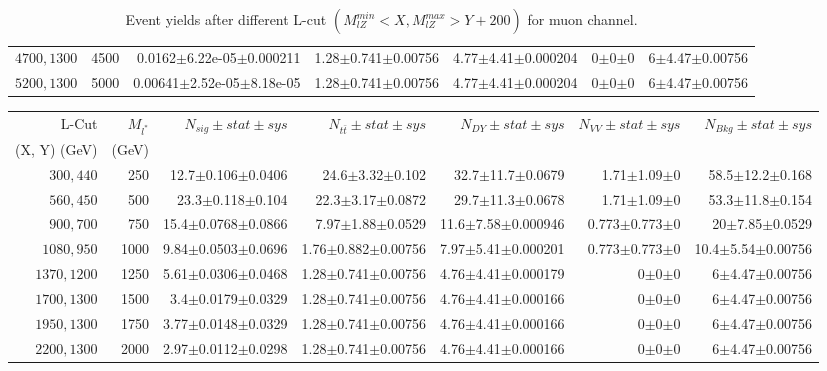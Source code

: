 \documentclass[]{article}
\begin{document}
\begin{table}
\begin{center}
{\begin{tabular}{ |r|r|r|r|r|r|r|}
$4700,1300$ & 4500 & 0.0162$\pm$6.22e-05$\pm$0.000211 & 1.28$\pm$0.741$\pm$0.00756 & 4.77$\pm$4.41$\pm$0.000204 & 0$\pm$0$\pm$0 & 6$\pm$4.47$\pm$0.00756 \\
$5200,1300$ & 5000 & 0.00641$\pm$2.52e-05$\pm$8.18e-05 & 1.28$\pm$0.741$\pm$0.00756 & 4.77$\pm$4.41$\pm$0.000204 & 0$\pm$0$\pm$0 & 6$\pm$4.47$\pm$0.00756 \\
\hline 
\end{tabular}
}
\end{center}
\caption{Event yields after different L-cut $(M_{lZ}^{min} < X, M_{lZ}^{max} > Y + 200)$ for muon channel.}
\end{table}
\begin{table}
\begin{center}
\scriptsize{
\begin{tabular}{ |r|r|r|r|r|r|r|}
\hline 
L-Cut & $M_{l^*}$ & $N_{sig}\pm stat \pm sys $ &$N_{t\bar{t}}\pm stat \pm sys $ & $N_{DY}\pm stat \pm sys $ & $N_{VV}\pm stat \pm sys $ &$N_{Bkg}\pm stat \pm sys$\\
 (X, Y) (GeV) & (GeV) & && &&\\
\hline 
$300, 440$ & 250 & 12.7$\pm$0.106$\pm$0.0406 & 24.6$\pm$3.32$\pm$0.102 & 32.7$\pm$11.7$\pm$0.0679 & 1.71$\pm$1.09$\pm$0 & 58.5$\pm$12.2$\pm$0.168 \\
$560, 450$ & 500 & 23.3$\pm$0.118$\pm$0.104 & 22.3$\pm$3.17$\pm$0.0872 & 29.7$\pm$11.3$\pm$0.0678 & 1.71$\pm$1.09$\pm$0 & 53.3$\pm$11.8$\pm$0.154 \\
$900, 700$ & 750 & 15.4$\pm$0.0768$\pm$0.0866 & 7.97$\pm$1.88$\pm$0.0529 & 11.6$\pm$7.58$\pm$0.000946 & 0.773$\pm$0.773$\pm$0 & 20$\pm$7.85$\pm$0.0529 \\
$1080,950$ & 1000 & 9.84$\pm$0.0503$\pm$0.0696 & 1.76$\pm$0.882$\pm$0.00756 & 7.97$\pm$5.41$\pm$0.000201 & 0.773$\pm$0.773$\pm$0 & 10.4$\pm$5.54$\pm$0.00756 \\
$1370,1200$ & 1250 & 5.61$\pm$0.0306$\pm$0.0468 & 1.28$\pm$0.741$\pm$0.00756 & 4.76$\pm$4.41$\pm$0.000179 & 0$\pm$0$\pm$0 & 6$\pm$4.47$\pm$0.00756 \\
$1700,1300$ & 1500 & 3.4$\pm$0.0179$\pm$0.0329 & 1.28$\pm$0.741$\pm$0.00756 & 4.76$\pm$4.41$\pm$0.000166 & 0$\pm$0$\pm$0 & 6$\pm$4.47$\pm$0.00756 \\
$1950,1300$ & 1750 & 3.77$\pm$0.0148$\pm$0.0329 & 1.28$\pm$0.741$\pm$0.00756 & 4.76$\pm$4.41$\pm$0.000166 & 0$\pm$0$\pm$0 & 6$\pm$4.47$\pm$0.00756 \\
$2200,1300$ & 2000 & 2.97$\pm$0.0112$\pm$0.0298 & 1.28$\pm$0.741$\pm$0.00756 & 4.76$\pm$4.41$\pm$0.000166 & 0$\pm$0$\pm$0 & 6$\pm$4.47$\pm$0.00756 \\

\end{tabular}}
\end{center}
\end{table}
\end{document}
